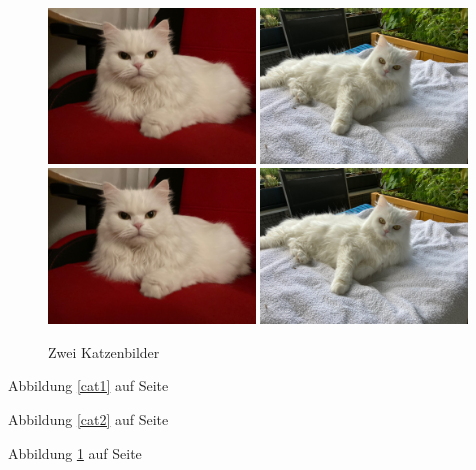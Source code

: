 \documentclass[12pt,ngerman]{scrartcl}
\begin{document}
\begin{figure}
\centering
{}
{\includegraphics[width=0.49\textwidth]{Bilder/Katze}}
{\includegraphics[width=0.49\textwidth]{Bilder/Katze1}}
{\includegraphics[width=0.49\textwidth]{Bilder/Katze}}
{\includegraphics[width=0.49\textwidth]{Bilder/Katze1}}
\caption{Zwei Katzenbilder}\label{katzenbilder}
\end{figure}

Abbildung \ref{cat1} auf Seite \pageref{katzenbilder}

Abbildung \ref{cat2} auf Seite \pageref{katzenbilder}

Abbildung \ref{katzenbilder} auf Seite \pageref{katzenbilder}
\end{document}
